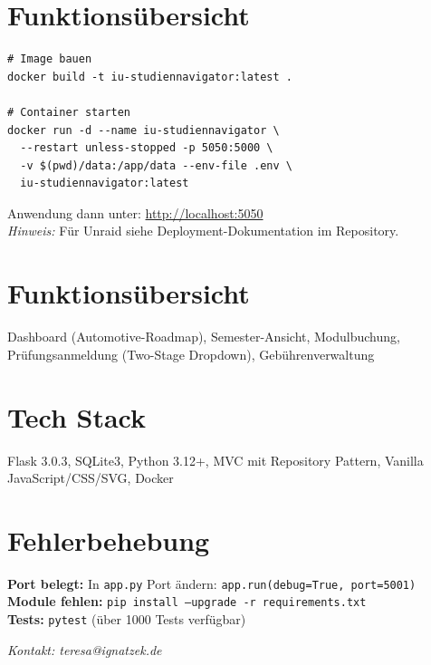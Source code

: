 \documentclass[11pt,a4paper]{article}
\begin{document}
\section*{Funktionsübersicht}
\begin{verbatim}
# Image bauen
docker build -t iu-studiennavigator:latest .

# Container starten
docker run -d --name iu-studiennavigator \
  --restart unless-stopped -p 5050:5000 \
  -v $(pwd)/data:/app/data --env-file .env \
  iu-studiennavigator:latest
\end{verbatim}
Anwendung dann unter: \url{http://localhost:5050}\\
\textit{Hinweis:} Für Unraid siehe Deployment-Dokumentation im Repository.

\section*{Funktionsübersicht}
Dashboard (Automotive-Roadmap), Semester-Ansicht, Modulbuchung, Prüfungsanmeldung (Two-Stage Dropdown), Gebührenverwaltung

\section*{Tech Stack}
Flask 3.0.3, SQLite3, Python 3.12+, MVC mit Repository Pattern, Vanilla JavaScript/CSS/SVG, Docker

\section*{Fehlerbehebung}
\textbf{Port belegt:} In \texttt{app.py} Port ändern: \texttt{app.run(debug=True, port=5001)}\\
\textbf{Module fehlen:} \texttt{pip install --upgrade -r requirements.txt}\\
\textbf{Tests:} \texttt{pytest} (über 1000 Tests verfügbar)

\vspace{0.2cm}
\noindent
\textit{Kontakt: teresa@ignatzek.de}
\end{document}
